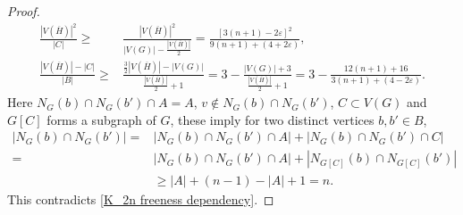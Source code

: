 \documentclass[10pt,a4paper]{amsart}
\begin{document}
\begin{proof}
\begin{align*}
\frac{|V(\overline{H})|^{2}}{|C|}\geq&\frac{|V(\overline{H})|^{2}}{|V(G)|-\frac{|V(\overline{H})|}{2}}=\frac{[3(n+1)-2\varepsilon]^{2}}{9(n+1)+(4+2\varepsilon)},\\
\frac{|V(\overline{H})|-|C|}{|B|}\geq&\frac{\frac{3}{2}|V(\overline{H})|-|V(G)|}{\frac{|V(\overline{H})|}{2}+1}=3-\frac{|V(G)|+3}{\frac{|V(\overline{H})|}{2}+1}=3-\frac{12(n+1)+16}{3(n+1)+(4-2\varepsilon)}.
\end{align*}
Here $N_{G}(b)\cap N_{G}(b')\cap A=A$, $v\notin N_{G}(b)\cap N_{G}(b')$, $C\subset V(G)$ and $G[C]$ forms a subgraph of $G$, these imply
for two distinct vertices $b,b'\in B$,
\begin{align*}
|N_{G}(b)\cap N_{G}(b')|=&|N_{G}(b)\cap N_{G}(b')\cap A|+|N_{G}(b)\cap N_{G}(b')\cap C|\\
=&|N_{G}(b)\cap N_{G}(b')\cap A|+|N_{G[C]}(b)\cap N_{G[C]}(b')|\\
&\geq |A|+(n-1)-|A|+1=n.
\end{align*}
This contradicts \eqref{K_2n freeness dependency}.
\end{proof}
\end{document}
